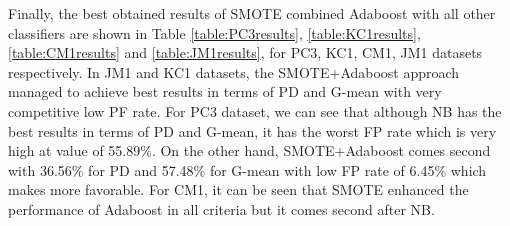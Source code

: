 \documentclass[runningheads,a4paper]{llncs}
\begin{document}
Finally, the best obtained results of SMOTE combined Adaboost with all other classifiers are shown in Table \ref{table:PC3results}, \ref{table:KC1results}, \ref{table:CM1results} and \ref{table:JM1results}, for PC3, KC1, CM1, JM1 datasets respectively. In JM1 and KC1 datasets, the SMOTE+Adaboost approach managed to achieve best results in terms of PD and G-mean with very competitive low PF rate. For PC3 dataset, we can see that although NB has the best results in terms of PD and G-mean, it has the worst FP rate which is very high at value of 55.89\%. On the other hand, SMOTE+Adaboost comes second with 36.56\%  for PD and 57.48\% for G-mean with low FP rate of 6.45\% which makes more favorable. For CM1, it can be seen that SMOTE enhanced the performance of Adaboost in all criteria but it comes second after NB. 



\begin{table}[H]
\caption{Evaluation results for PC3 dataset}
\begin{centering}
\par\end{centering}
\label{table:PC3results}
\end{table}


\begin{table}[H]
\caption{Evaluation results for KC1 dataset}
\begin{centering}
\par\end{centering}
\label{table:KC1results}
\end{table}
\end{document}
